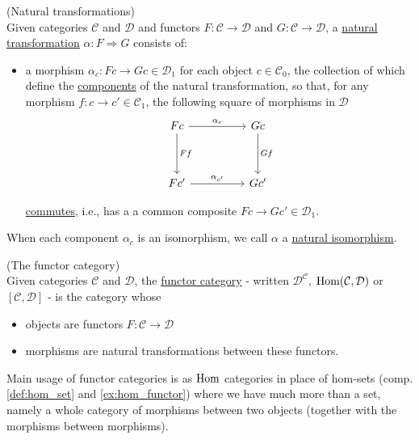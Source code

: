 \begin{definition}{(Natural transformations)}\label{def:natural_transformation}\\
\noindent Given categories $\mathcal{C}$ and $\mathcal{D}$ and functors $F : \mathcal{C} \rightarrow \mathcal{D}$ and
$G : \mathcal{C} \rightarrow \mathcal{D}$, a \ul{natural transformation} $\alpha : F \Rightarrow G$ consists of:
\begin{itemize}
\item a morphism $\alpha_{c} : Fc \rightarrow Gc \in \mathcal{D}_{1}$ for each object $c \in \mathcal{C}_{0}$, the collection of which
define the \ul{components} of the natural transformation, so that, for any morphism $f : c \rightarrow c' \in \mathcal{C}_{1}$, the following
square of morphisms in $\mathcal{D}$
\[\begin{tikzcd}
Fc \arrow[rr, "\alpha_{c}"] \arrow[dd, "Ff"] &  & Gc \arrow[dd, "Gf"] \\
                                             &  &                     \\
Fc' \arrow[rr, "\alpha_{c'}"]                &  & Gc'                
\end{tikzcd}\]

\ul{commutes}, i.e., has a a common composite $Fc \rightarrow Gc' \in \mathcal{D}_{1}$.
\end{itemize}
When each component $\alpha_{c}$ is an isomorphism, we call $\alpha$ a \ul{natural isomorphism}.
\end{definition}

\begin{definition}{(The functor category)}\label{def:functor_category}\\
Given categories $\mathcal{C}$ and $\mathcal{D}$, the \ul{functor category} - written $\mathcal{D}^{\mathcal{C}}$, $\textup{Hom}(\mathcal{C},
\mathcal{D})$ or $[\mathcal{C}, \mathcal{D}]$ -
is the category whose
\begin{itemize}
\item objects are functors $F : \mathcal{C} \rightarrow \mathcal{D}$
\item morphisms are natural transformations between these functors.
\end{itemize}
Main usage of functor categories is as $\textup{Hom}$ categories in place of hom-sets (comp. \ref{def:hom_set} and \ref{ex:hom_functor}) where
we have much more than a set, namely a whole category of morphisms between two objects (together with the morphisms between morphisms).
\end{definition}






















